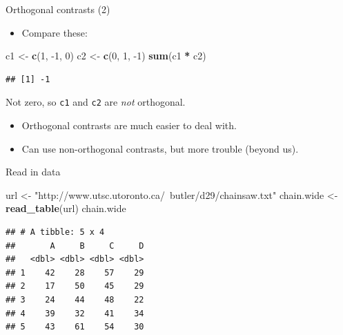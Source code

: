 \documentclass[ignorenonframetext,]{beamer}
\newenvironment{Shaded}{\begin{snugshade}}{\end{snugshade}}
\newcommand{\DecValTok}[1]{\textcolor[rgb]{0.00,0.00,0.81}{#1}}
\newcommand{\KeywordTok}[1]{\textcolor[rgb]{0.13,0.29,0.53}{\textbf{#1}}}
\newcommand{\NormalTok}[1]{#1}
\newcommand{\OperatorTok}[1]{\textcolor[rgb]{0.81,0.36,0.00}{\textbf{#1}}}
\newcommand{\StringTok}[1]{\textcolor[rgb]{0.31,0.60,0.02}{#1}}
\providecommand{\tightlist}{%
  \setlength{\itemsep}{0pt}\setlength{\parskip}{0pt}}
\begin{document}
\begin{frame}[fragile]{Orthogonal contrasts (2)}
\protect\hypertarget{orthogonal-contrasts-2}{}

\begin{itemize}
\tightlist
\item
  Compare these:
\end{itemize}

\normalsize

\begin{Shaded}
\begin{Highlighting}[]
\NormalTok{c1 <-}\StringTok{ }\KeywordTok{c}\NormalTok{(}\DecValTok{1}\NormalTok{, }\DecValTok{-1}\NormalTok{, }\DecValTok{0}\NormalTok{)}
\NormalTok{c2 <-}\StringTok{ }\KeywordTok{c}\NormalTok{(}\DecValTok{0}\NormalTok{, }\DecValTok{1}\NormalTok{, }\DecValTok{-1}\NormalTok{)}
\KeywordTok{sum}\NormalTok{(c1 }\OperatorTok{*}\StringTok{ }\NormalTok{c2)}
\end{Highlighting}
\end{Shaded}

\begin{verbatim}
## [1] -1
\end{verbatim}

\normalsize

Not zero, so \texttt{c1} and \texttt{c2} are \emph{not} orthogonal.

\begin{itemize}
\item
  Orthogonal contrasts are much easier to deal with.
\item
  Can use non-orthogonal contrasts, but more trouble (beyond us).
\end{itemize}

\end{frame}

\begin{frame}[fragile]{Read in data}
\protect\hypertarget{read-in-data-1}{}

\small

\begin{Shaded}
\begin{Highlighting}[]
\NormalTok{url <-}\StringTok{ "http://www.utsc.utoronto.ca/~butler/d29/chainsaw.txt"}
\NormalTok{chain.wide <-}\StringTok{ }\KeywordTok{read_table}\NormalTok{(url)}
\NormalTok{chain.wide}
\end{Highlighting}
\end{Shaded}

\begin{verbatim}
## # A tibble: 5 x 4
##       A     B     C     D
##   <dbl> <dbl> <dbl> <dbl>
## 1    42    28    57    29
## 2    17    50    45    29
## 3    24    44    48    22
## 4    39    32    41    34
## 5    43    61    54    30
\end{verbatim}

\normalsize

\end{frame}
\end{document}
